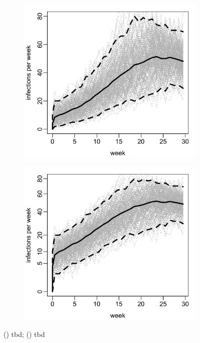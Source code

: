 \documentclass{uwstat572}
\begin{document}
\begin{figure}[H]
	\centering
	\begin{subfigure}[b]{0.49\textwidth}
		\includegraphics[width=\textwidth]{figures/figure_4b_all_plants.png}
		\caption{}
		\label{fig:all_infections}
	\end{subfigure}
	\hfill
	\begin{subfigure}[b]{0.49\textwidth}
		\includegraphics[width=\textwidth]{figures/figure_4b_all_plants_root.png}
		\caption{}
		\label{fig:root_all_infections}
	\end{subfigure}
	\caption{() tbd; () tbd }
	\label{fig:data_plot}
\end{figure} 
\end{document}
